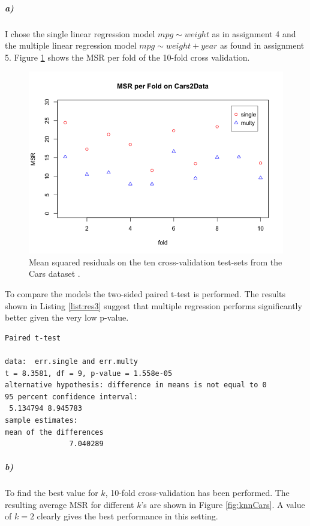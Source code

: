 \documentclass{paper}
\begin{document}
\subparagraph{a)}

I chose the single linear regression model $mpg \sim weight$ as in assignment 4 and the multiple linear regression model $mpg\sim weight+year$ as found in 
assignment 5. Figure \ref{fig:smCars} shows the MSR per fold of the 10-fold cross validation.

\begin{figure}[h]
\begin{center}
\includegraphics[width=0.8\linewidth]{smCars}
\end{center}
\caption{Mean squared residuals on the ten cross-validation test-sets from the Cars dataset . }
\label{fig:smCars}
\end{figure}

To compare the models the two-sided paired t-test is performed. The results shown in Listing \ref{list:res3} suggest that multiple regression 
performs significantly better given the very low p-value. 

\begin{minipage}{\linewidth}
  \begin{lstlisting}[caption={Results of paired t-test single vs. multiple regression.},
    label=list:res3]
	Paired t-test

data:  err.single and err.multy
t = 8.3581, df = 9, p-value = 1.558e-05
alternative hypothesis: difference in means is not equal to 0
95 percent confidence interval:
 5.134794 8.945783
sample estimates:
mean of the differences 
               7.040289 
  \end{lstlisting}
\end{minipage}



\subparagraph{b)}

To find the best value for $k$, 10-fold cross-validation has been performed. The resulting average MSR for different $k$'s are shown in 
Figure \ref{fig:knnCars}. A value of $k=2$ clearly gives the best performance in this setting.
\end{document}
